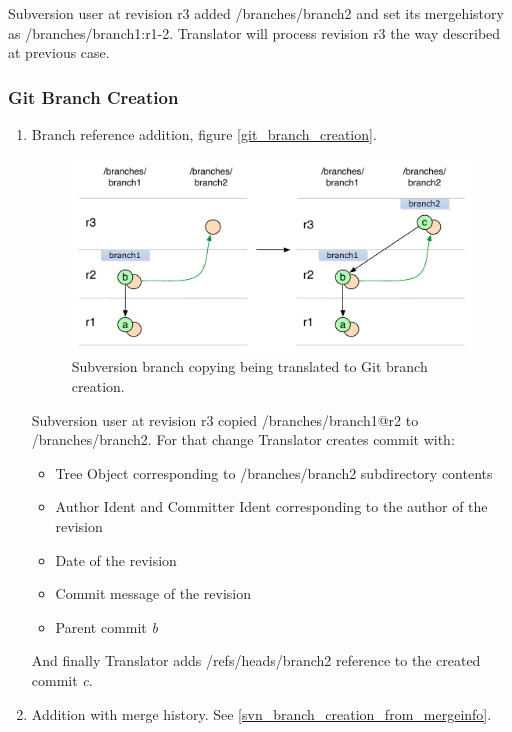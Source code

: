 \begin{enumerate}
Subversion user at revision r3 added /branches/branch2 and set its mergehistory as /branches/branch1:r1-2. Translator will process revision r3 the way described at previous case.
\end{enumerate}

\subsubsection{Git Branch Creation}

\begin{enumerate}
\compactlist
\item Branch reference addition, figure \ref{git_branch_creation}.

\begin{figure}[!h]
\centering
\includegraphics[width=\linewidth]{img/diagrams/branch_creation_svn_to_git.pdf}
\caption{Subversion branch copying being translated to Git branch creation.}
\label{svn_branch_creation}
\end{figure}

Subversion user at revision r3 copied /branches/branch1@r2 to /branches/branch2. For that change Translator creates commit with:
\begin{itemize}
	\item Tree Object corresponding to /branches/branch2 subdirectory contents
	\item Author Ident and Committer Ident corresponding to the author of the revision
	\item Date of the revision
	\item Commit message of the revision
	\item Parent commit \emph{b}
\end{itemize}
And finally Translator adds /refs/heads/branch2 reference to the created commit \emph{c}.

\item Addition with merge history. See \ref{svn_branch_creation_from_mergeinfo}.


\end{enumerate}
